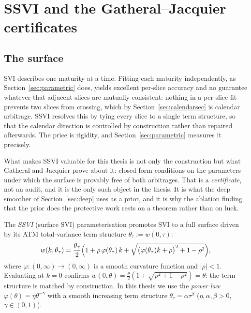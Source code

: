 \section{SSVI and the Gatheral--Jacquier certificates}\label{sec:ssvisec}

\subsection{The surface}

SVI describes one maturity at a time. Fitting each maturity independently, as
Section~\ref{sec:parametric} does, yields excellent per-slice accuracy and no guarantee whatever
that adjacent slices are mutually consistent: nothing in a per-slice fit prevents two slices
from crossing, which by Section~\ref{sec:calendarsec} is calendar arbitrage. SSVI resolves this
by tying every slice to a single term structure, so that the calendar direction is controlled by
construction rather than repaired afterwards. The price is rigidity, and
Section~\ref{sec:parametric} measures it precisely.

What makes SSVI valuable for this thesis is not only the construction but what Gatheral and
Jacquier prove about it: closed-form conditions on the parameters under which the surface is
provably free of both arbitrages. That is a \emph{certificate}, not an audit, and it is the only
such object in the thesis. It is what the deep smoother of Section~\ref{sec:deep} uses as a
prior, and it is why the ablation finding that the prior does the protective work rests on a
theorem rather than on luck.

The \emph{SSVI} (surface SVI) parameterisation \cite{gatheraljacquier2014} promotes SVI to a
full surface driven by its ATM total-variance term structure
$\theta_\tau:=w(0,\tau)$:
\begin{equation}\label{eq:ssvi}
w(k,\theta_\tau)=\frac{\theta_\tau}{2}\Bigl(1+\rho\,\varphi(\theta_\tau)\,k
+\sqrt{\bigl(\varphi(\theta_\tau)k+\rho\bigr)^2+1-\rho^2}\Bigr),
\end{equation}
where $\varphi:(0,\infty)\to(0,\infty)$ is a smooth curvature function and $|\rho|<1$.
Evaluating at $k=0$ confirms $w(0,\theta)=\tfrac\theta2(1+\sqrt{\rho^2+1-\rho^2})=\theta$: the
term structure is matched by construction. In this thesis we use the \emph{power law}
$\varphi(\theta)=\eta\theta^{-\gamma}$ with a smooth increasing term structure
$\theta_\tau=\alpha\tau^{\beta}$ ($\eta,\alpha,\beta>0$, $\gamma\in(0,1)$).

